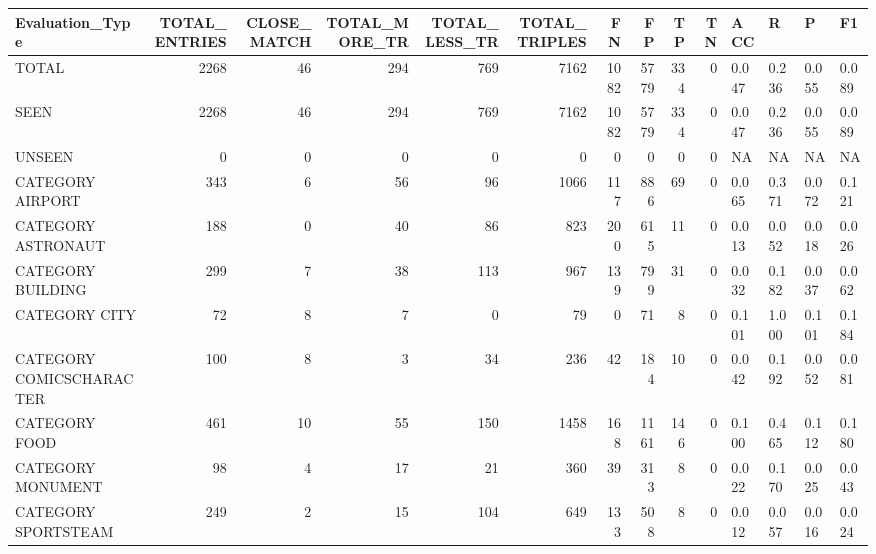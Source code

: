 \begin{tabular}{lrrrrrrrrrllll}
\hline
 Evaluation\_Type          &   TOTAL\_ENTRIES &   CLOSE\_MATCH &   TOTAL\_MORE\_TR &   TOTAL\_LESS\_TR &   TOTAL\_TRIPLES &   FN &   FP &   TP &   TN & ACC   & R     & P     & F1    \\
\hline
 TOTAL                    &            2268 &            46 &             294 &             769 &            7162 & 1082 & 5779 &  334 &    0 & 0.047 & 0.236 & 0.055 & 0.089 \\
 SEEN                     &            2268 &            46 &             294 &             769 &            7162 & 1082 & 5779 &  334 &    0 & 0.047 & 0.236 & 0.055 & 0.089 \\
 UNSEEN                   &               0 &             0 &               0 &               0 &               0 &    0 &    0 &    0 &    0 & NA    & NA    & NA    & NA    \\
 CATEGORY AIRPORT         &             343 &             6 &              56 &              96 &            1066 &  117 &  886 &   69 &    0 & 0.065 & 0.371 & 0.072 & 0.121 \\
 CATEGORY ASTRONAUT       &             188 &             0 &              40 &              86 &             823 &  200 &  615 &   11 &    0 & 0.013 & 0.052 & 0.018 & 0.026 \\
 CATEGORY BUILDING        &             299 &             7 &              38 &             113 &             967 &  139 &  799 &   31 &    0 & 0.032 & 0.182 & 0.037 & 0.062 \\
 CATEGORY CITY            &              72 &             8 &               7 &               0 &              79 &    0 &   71 &    8 &    0 & 0.101 & 1.000 & 0.101 & 0.184 \\
 CATEGORY COMICSCHARACTER &             100 &             8 &               3 &              34 &             236 &   42 &  184 &   10 &    0 & 0.042 & 0.192 & 0.052 & 0.081 \\
 CATEGORY FOOD            &             461 &            10 &              55 &             150 &            1458 &  168 & 1161 &  146 &    0 & 0.100 & 0.465 & 0.112 & 0.180 \\
 CATEGORY MONUMENT        &              98 &             4 &              17 &              21 &             360 &   39 &  313 &    8 &    0 & 0.022 & 0.170 & 0.025 & 0.043 \\
 CATEGORY SPORTSTEAM      &             249 &             2 &              15 &             104 &             649 &  133 &  508 &    8 &    0 & 0.012 & 0.057 & 0.016 & 0.024 \\

\end{tabular}
